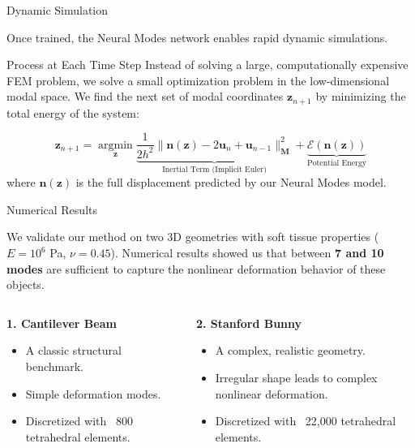 \documentclass{beamer}
\DeclareMathOperator{\argmin}{argmin}
\begin{document}
\begin{frame}{Dynamic Simulation}
    
    Once trained, the Neural Modes network enables rapid dynamic simulations.
    
    \begin{block}{Process at Each Time Step}
        Instead of solving a large, computationally expensive FEM problem, we solve a small optimization problem in the low-dimensional modal space. We find the next set of modal coordinates \(\mathbf{z}_{n+1}\) by minimizing the total energy of the system:
        
        \begin{equation}
            \mathbf{z}_{n+1} = \underset{\mathbf{z}}{\argmin} \underbrace{\frac{1}{2h^2} \|\bm{n}(\mathbf{z}) - 2\bm{u}_n + \bm{u}_{n-1}\|_{\bm{M}}^2}_{\text{Inertial Term (Implicit Euler)}} + \underbrace{\mathcal{E}(\bm{n}(\mathbf{z}))}_{\text{Potential Energy}}
        \end{equation}
        where \(\bm{n}(\mathbf{z})\) is the full displacement predicted by our Neural Modes model.
    \end{block}
    
\end{frame}


\begin{frame}{Numerical Results}
    
    We validate our method on two 3D geometries with soft tissue properties ($E = 10^6$ Pa, $\nu = 0.45$). Numerical results showed us that between \textbf{7 and 10 modes} are sufficient to capture the nonlinear deformation behavior of these objects.
    
    \begin{columns}[T]
        \begin{column}{0.45\textwidth}
            \textbf{1. Cantilever Beam}
            \begin{itemize}
                \item A classic structural benchmark.
                \item Simple deformation modes.
                \item Discretized with ~800 tetrahedral elements.
            \end{itemize}
        \end{column}
        
        \begin{column}{0.55\textwidth}
            \textbf{2. Stanford Bunny}
            \begin{itemize}
                \item A complex, realistic geometry.
                \item Irregular shape leads to complex nonlinear deformation.
                \item Discretized with ~22,000 tetrahedral elements.
            \end{itemize}
    
        \end{column}
    \end{columns}
\end{frame}
\end{document}
